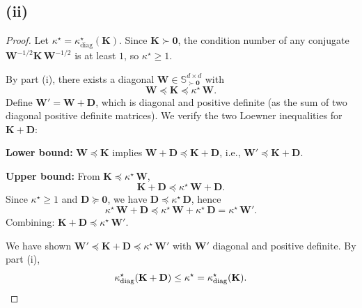 \subsection*{(ii)}

\begin{proof}
Let $\kappa^\star = \kappa^\star_{\mathrm{diag}}(\mathbf{K})$. Since $\mathbf{K} \succ \mathbf{0}$, the condition number of any conjugate $\mathbf{W}^{-1/2}\mathbf{K}\,\mathbf{W}^{-1/2}$ is at least $1$, so $\kappa^\star \ge 1$.

By part (i), there exists a diagonal $\mathbf{W} \in \mathbb{S}^{d \times d}_{\succ \mathbf{0}}$ with
\[
\mathbf{W} \preceq \mathbf{K} \preceq \kappa^\star\,\mathbf{W}.
\]
Define $\mathbf{W}' = \mathbf{W} + \mathbf{D}$, which is diagonal and positive definite (as the sum of two diagonal positive definite matrices). We verify the two Loewner inequalities for $\mathbf{K} + \mathbf{D}$:

\textbf{Lower bound:}\; $\mathbf{W} \preceq \mathbf{K}$ implies $\mathbf{W} + \mathbf{D} \preceq \mathbf{K} + \mathbf{D}$, i.e., $\mathbf{W}' \preceq \mathbf{K} + \mathbf{D}$.

\textbf{Upper bound:}\; From $\mathbf{K} \preceq \kappa^\star\,\mathbf{W}$,
\[
\mathbf{K} + \mathbf{D} \preceq \kappa^\star\,\mathbf{W} + \mathbf{D}.
\]
Since $\kappa^\star \ge 1$ and $\mathbf{D} \succeq \mathbf{0}$, we have $\mathbf{D} \preceq \kappa^\star\,\mathbf{D}$, hence
\[
\kappa^\star\,\mathbf{W} + \mathbf{D} \preceq \kappa^\star\,\mathbf{W} + \kappa^\star\,\mathbf{D} = \kappa^\star\,\mathbf{W}'.
\]
Combining: $\mathbf{K} + \mathbf{D} \preceq \kappa^\star\,\mathbf{W}'$.

We have shown $\mathbf{W}' \preceq \mathbf{K} + \mathbf{D} \preceq \kappa^\star\,\mathbf{W}'$ with $\mathbf{W}'$ diagonal and positive definite. By part (i),
\[
\kappa^\star_{\mathrm{diag}}(\mathbf{K} + \mathbf{D}) \le \kappa^\star = \kappa^\star_{\mathrm{diag}}(\mathbf{K}). \qedhere
\]
\end{proof}
